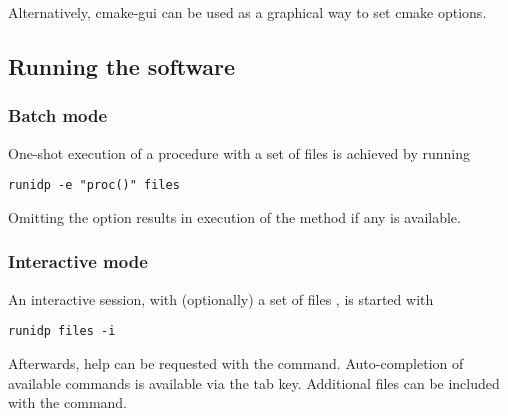 Alternatively, cmake-gui can be used as a graphical way to set cmake options.

\subsection{Running the software}
\subsubsection{Batch mode}
One-shot execution of a procedure  with a set of files  is achieved by running
\begin{lstlisting}
runidp -e "proc()" files
\end{lstlisting}
Omitting the  option results in execution of the  method if any is available.

\subsubsection{Interactive mode}
An interactive session, with (optionally) a set of files , is started with 
\begin{lstlisting}
runidp files -i
\end{lstlisting}

Afterwards, help can be requested with the  command. 
Auto-completion of available commands is available via the tab key.
Additional files can be included with the  command.

